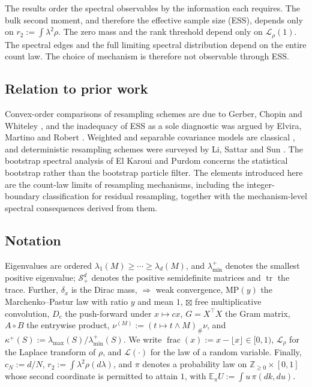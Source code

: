 \documentclass[lettersize,journal]{IEEEtran}
\theoremstyle{remark}
\begin{document}
The results order the spectral observables by the information each requires.
The bulk second moment, and therefore the effective sample size (ESS), depends
only on $r_2:=\int\lambda^2\rho$. The zero mass and the rank threshold depend
only on $\mathcal{L}_\rho(1)$. The spectral edges and the full limiting
spectral distribution depend on the entire count law. The choice of mechanism
is therefore not observable through ESS\cite{martino2017ess}.

\subsection{Relation to prior work}

Convex-order comparisons of resampling schemes are due to Gerber, Chopin and
Whiteley \cite{gerber2019negative}, and the inadequacy of ESS as a sole
diagnostic was argued by Elvira, Martino and Robert
\cite{elvira2022rethinking}. Weighted and separable covariance models are
classical \cite{silverstein1995strong,bai2010spectral,hachem2007deterministic,%
zhang2006spectral,paul2009no}, and deterministic resampling schemes were
surveyed by Li, Sattar and Sun \cite{li2012deterministic}. The bootstrap
spectral analysis of El Karoui and Purdom \cite{elkaroui2016bootstrap}
concerns the statistical bootstrap rather than the bootstrap particle filter\cite{gordon1993novel, cappe2007overview}.
The elements introduced here are the count-law limits of resampling
mechanisms, including the integer-boundary classification for residual
resampling, together with the mechanism-level spectral consequences derived
from them.

\subsection{Notation}

Eigenvalues are ordered $\lambda_1(M)\ge\cdots\ge\lambda_d(M)$, and
$\lambda_{\min}^+$ denotes the smallest positive eigenvalue;
$\mathcal{S}_+^d$ denotes the positive semidefinite matrices and
$\operatorname{tr}$ the trace. Further, $\delta_x$ is the Dirac mass,
$\Rightarrow$ weak convergence, $\mathrm{MP}(y)$ the Marchenko--Pastur law\cite{marchenko1967distribution}
with ratio $y$ and mean $1$, $\boxtimes$ free multiplicative convolution,
$D_c$ the push-forward under $x\mapsto cx$, $G=X^\top X$ the Gram matrix,
$A\circ B$ the entrywise product, $\nu^{(M)}:=(t\mapsto t\wedge M)_\#\nu$, and
$\kappa^+(S):=\lambda_{\max}(S)/\lambda_{\min}^+(S)$. We write
$\operatorname{frac}(x):=x-\lfloor x\rfloor\in[0,1)$, $\mathcal{L}_\rho$ for
the Laplace transform of $\rho$, and $\mathcal{L}(\cdot)$ for the law of a
random variable. Finally, $c_N:=d/N$, $r_2:=\int\lambda^2\rho(d\lambda)$, and
$\pi$ denotes a probability law on $\mathbb{Z}_{\ge0}\times[0,1]$ whose second
coordinate is permitted to attain $1$, with
$\mathbb{E}_\pi U:=\int u\,\pi(dk,du)$.
\end{document}
